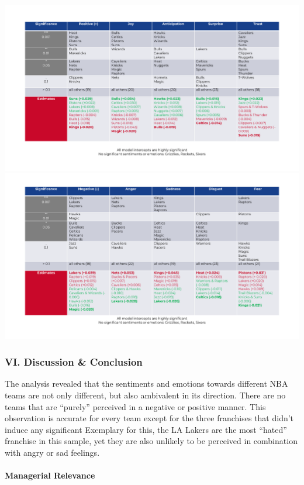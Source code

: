 \documentclass[
]{article}
\begin{document}
\includegraphics[width=55.56in]{../output/Positive Sentiments & Emotions}
\includegraphics[width=55.56in]{../output/Negative Sentiments & Emotions}

\hfill\break

\hypertarget{vi.-discussion-conclusion}{%
\subsubsection{VI. Discussion \&
Conclusion}\label{vi.-discussion-conclusion}}

The analysis revealed that the sentiments and emotions towards different
NBA teams are not only different, but also ambivalent in its direction.
There are no teams that are ``purely'' perceived in a negative or
positive manner. This observation is accurate for every team except for
the three franchises that didn't induce any significant Exemplary for
this, the LA Lakers are the most ``hated'' franchise in this sample, yet
they are also unlikely to be perceived in combination with angry or sad
feelings.

\hypertarget{managerial-relevance}{%
\paragraph{Managerial Relevance}\label{managerial-relevance}}
\end{document}
